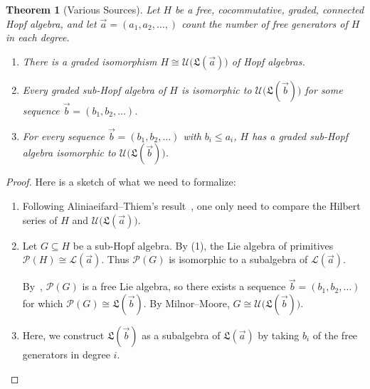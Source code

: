 \documentclass[11pt]{amsart}
\newtheorem{thm}{Theorem}
\theoremstyle{definition}
\numberwithin{equation}{section}
\newcommand{\lucas}[1]{\todo[size=\tiny,color=red!50]{#1 \\ \hfill --- Lucas}}
\begin{document}
\begin{thm}[Various Sources]
Let $H$ be a free, cocommutative, graded, connected Hopf algebra, and let $\vec{a} = (a_{1}, a_{2}, \ldots, )$ count the number of free generators of $H$ in each degree.  
\begin{enumerate}
\item There is a graded isomorphism $H \cong \mathcal{U}\big(\mathfrak{L}(\vec{a})\big)$ of Hopf algebras.

\item Every graded sub-Hopf algebra of $H$ is isomorphic to $\mathcal{U}\big(\mathfrak{L}(\vec{b})\big)$ for some sequence $\vec{b} = (b_{1}, b_{2}, \ldots)$.

\item For every sequence $\vec{b} = (b_{1}, b_{2}, \ldots)$ with $b_{i} \le a_{i}$, $H$ has a graded sub-Hopf algebra isomorphic to $\mathcal{U}\big(\mathfrak{L}(\vec{b})\big)$.

\end{enumerate}
\end{thm}
\begin{proof}
Here is a sketch of what we need to formalize:
\begin{enumerate}
\item %

Following Aliniaeifard--Thiem's result~\cite[Theorem 4.2]{AT22}, one only need to compare the Hilbert series of $H$ and $\mathcal{U}\big(\mathfrak{L}(\vec{a})\big)$.


\item Let $G \subseteq H$ be a sub-Hopf algebra.  By (1), the Lie algebra of primitives $\mathcal{P}(H) \cong \mathcal{L}(\vec{a})$.  Thus $\mathcal{P}(G)$ is isomorphic to a subalgebra of $\mathcal{L}(\vec{a})$.  

By~\cite[Theorem 2.2]{MSZ}, $\mathcal{P}(G)$ is a free Lie algebra, so there exists a sequence $\vec{b} = (b_{1}, b_{2}, \ldots)$ for which $\mathcal{P}(G) \cong \mathfrak{L}(\vec{b})$.
By Milnor--Moore, $G \cong \mathcal{U}\big(\mathfrak{L}(\vec{b})\big)$.


\item Here, we construct $\mathfrak{L}(\vec{b})$ as a subalgebra of $\mathfrak{L}(\vec{a})$ by taking $b_{i}$ of the free generators in degree $i$.
\end{enumerate}
\end{proof}
\end{document}
